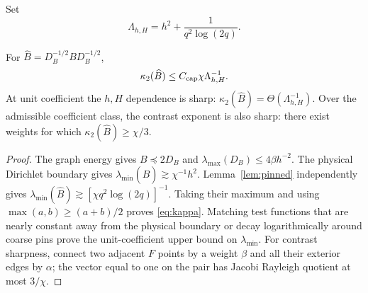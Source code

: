 \documentclass[smallextended]{svjour3}
\begin{document}
Set
\begin{equation}\label{eq:Lambda}
 \Lambda_{h,H}=h^2+\frac{1}{q^2\log(2q)}.
\end{equation}
\begin{theorem}\label{thm:kappa}
For $\widehat B=D_B^{-1/2}BD_B^{-1/2}$,
\begin{equation}\label{eq:kappa}
 \kappa_2(\widehat B)\le C_{\rm cap}\chi\Lambda_{h,H}^{-1}.
\end{equation}
At unit coefficient the $h,H$ dependence is sharp:
$\kappa_2(\widehat B)=\Theta(\Lambda_{h,H}^{-1})$. Over the admissible coefficient class, the contrast exponent is also sharp: there exist weights for which
$\kappa_2(\widehat B)\ge\chi/3$.
\end{theorem}
\begin{proof}
The graph energy gives $B\preceq2D_B$ and
$\lambda_{\max}(D_B)\le4\beta h^{-2}$. The physical Dirichlet boundary gives
$\lambda_{\min}(\widehat B)\gtrsim\chi^{-1}h^2$. Lemma~\ref{lem:pinned} independently gives
$\lambda_{\min}(\widehat B)\gtrsim[\chi q^2\log(2q)]^{-1}$. Taking their maximum and using $\max(a,b)\ge(a+b)/2$ proves \eqref{eq:kappa}. Matching test functions that are nearly constant away from the physical boundary or decay logarithmically around coarse pins prove the unit-coefficient upper bound on $\lambda_{\min}$. For contrast sharpness, connect two adjacent $F$ points by a weight $\beta$ and all their exterior edges by $\alpha$; the vector equal to one on the pair has Jacobi Rayleigh quotient at most $3/\chi$.
\end{proof}
\end{document}
